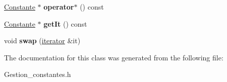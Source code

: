 \begin{DoxyCompactItemize}
\item 
\hypertarget{class_stack_1_1iterator_ad0c0d548f2189cf62d44a9b9e1860b88}{\hyperlink{class_calcul_1_1_constante}{Constante} $\ast$ {\bfseries operator$\ast$} () const }\label{class_stack_1_1iterator_ad0c0d548f2189cf62d44a9b9e1860b88}

\item 
\hypertarget{class_stack_1_1iterator_a29db2d0193cf47fb1d12e50c7219b355}{\hyperlink{class_calcul_1_1_constante}{Constante} $\ast$ {\bfseries get\-It} () const }\label{class_stack_1_1iterator_a29db2d0193cf47fb1d12e50c7219b355}

\item 
\hypertarget{class_stack_1_1iterator_a968852ab69c70d5529c931bf61d6c2c1}{void {\bfseries swap} (\hyperlink{class_stack_1_1iterator}{iterator} \&it)}\label{class_stack_1_1iterator_a968852ab69c70d5529c931bf61d6c2c1}

\end{DoxyCompactItemize}


The documentation for this class was generated from the following file\-:\begin{DoxyCompactItemize}
\item 
Gestion\-\_\-constantes.\-h\end{DoxyCompactItemize}
